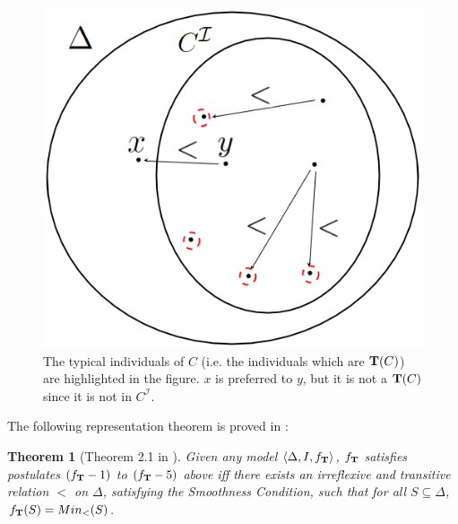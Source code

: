 \documentclass[a4paper, 11pt, oneside]{duthesis}
\newcommand{\tip}{{\bf T}}
\newtheorem{theorem}{Theorem}
\newcounter{posu}
\newtheorem{theorem}[posu]{Theorem}
\begin{document}

\begin{figure}[h]
\centering
\includegraphics[scale=.40]{img/diagram1_9.png}
\caption{The typical individuals of $C$ (i.e. the individuals which are $\tip(C)$) are highlighted in the figure. $x$ is preferred to $y$, but it is not a $\tip(C)$ since it is not in $C^{\mathcal{I}}.$}
\label{rel_preferenza}
\end{figure}


\noindent The following representation theorem is proved in \cite{FI09}:

\begin{theorem}[Theorem 2.1 in \cite{FI09}]\label{rtrt} Given any model $\langle \Delta, I, f_\tip
\rangle$, $f_\tip$ satisfies postulates $(f_\tip-1)$ to $(f_\tip-5)$ above iff there exists  an irreflexive and transitive relation $<$ on $\Delta$, satisfying the Smoothness Condition, such that for all $S \subseteq \Delta$, $f_\tip(S) = Min_<(S)$.
\end{theorem}
\end{document}
